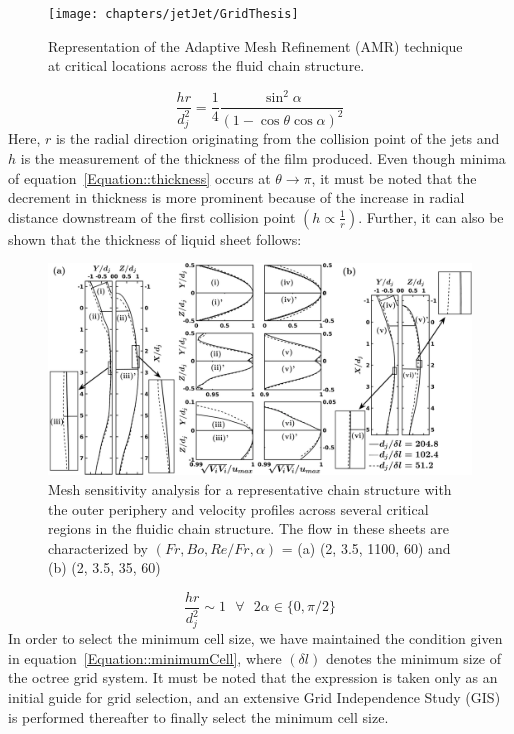 \begin{figure}
    \centering
    \texttt{[image: chapters/jetJet/GridThesis]}
    \caption{Representation of the Adaptive Mesh Refinement (AMR) technique at critical locations across the fluid chain structure.}
    \label{Figure::gisetal1}
\end{figure}
\begin{equation}\label{Equation::thickness}
\frac{hr}{d_j^2} = \frac{1}{4}\frac{\sin^2\alpha}{(1-\cos\theta\cos\alpha)^2}
\end{equation} 
Here, $r$ is the radial direction originating from the collision point of the jets and $h$ is the measurement of the thickness of the film produced. Even though minima of equation~\ref{Equation::thickness} occurs at $\theta \to \pi$, it must be noted that the decrement in thickness is more prominent because of the increase in radial distance downstream of the first collision point $\left(h \propto \frac{1}{r}\right)$. Further, it can also be shown that the thickness of liquid sheet follows:
\begin{figure}
    \centering
    \includegraphics[width=\textwidth]{chapters/jetJet/GISThesis}
    \caption{Mesh sensitivity analysis for a representative chain structure with the outer periphery and velocity profiles across several critical regions in the fluidic chain structure. The flow in these sheets are characterized by $\left(Fr, Bo, Re/Fr, \alpha\right)$ = (a) (2, 3.5, 1100, 60\degree) and (b) (2, 3.5, 35, 60\degree)}
    \label{Figure::gisetal2}
\end{figure}
\begin{equation}
\frac{hr}{d_j^2} \sim 1\:\:\:\forall\:\:\:2\alpha \in \{0,\pi/2\}
\end{equation}
In order to select the minimum cell size, we have maintained the condition given in equation~\ref{Equation::minimumCell}, where $\left(\delta l\right)$ denotes the minimum size of the octree grid system. It must be noted that the expression is taken only as an initial guide for grid selection, and an extensive Grid Independence Study (GIS) is performed thereafter to finally select the minimum cell size.
